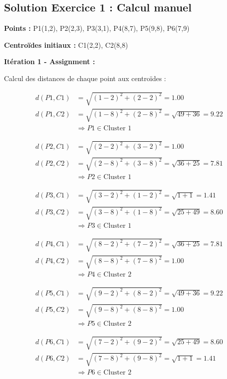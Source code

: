\documentclass[11pt,a4paper]{article}
\begin{document}
\subsection{Solution Exercice 1 : Calcul manuel}

\begin{solutionbox}
\textbf{Points :} P1(1,2), P2(2,3), P3(3,1), P4(8,7), P5(9,8), P6(7,9)

\textbf{Centroïdes initiaux :} C1(2,2), C2(8,8)

\textbf{Itération 1 - Assignment :}

Calcul des distances de chaque point aux centroïdes :

\begin{align*}
d(P1, C1) &= \sqrt{(1-2)^2 + (2-2)^2} = 1.00 \\
d(P1, C2) &= \sqrt{(1-8)^2 + (2-8)^2} = \sqrt{49 + 36} = 9.22 \\
&\Rightarrow P1 \in \text{Cluster 1}
\end{align*}

\begin{align*}
d(P2, C1) &= \sqrt{(2-2)^2 + (3-2)^2} = 1.00 \\
d(P2, C2) &= \sqrt{(2-8)^2 + (3-8)^2} = \sqrt{36 + 25} = 7.81 \\
&\Rightarrow P2 \in \text{Cluster 1}
\end{align*}

\begin{align*}
d(P3, C1) &= \sqrt{(3-2)^2 + (1-2)^2} = \sqrt{1 + 1} = 1.41 \\
d(P3, C2) &= \sqrt{(3-8)^2 + (1-8)^2} = \sqrt{25 + 49} = 8.60 \\
&\Rightarrow P3 \in \text{Cluster 1}
\end{align*}

\begin{align*}
d(P4, C1) &= \sqrt{(8-2)^2 + (7-2)^2} = \sqrt{36 + 25} = 7.81 \\
d(P4, C2) &= \sqrt{(8-8)^2 + (7-8)^2} = 1.00 \\
&\Rightarrow P4 \in \text{Cluster 2}
\end{align*}

\begin{align*}
d(P5, C1) &= \sqrt{(9-2)^2 + (8-2)^2} = \sqrt{49 + 36} = 9.22 \\
d(P5, C2) &= \sqrt{(9-8)^2 + (8-8)^2} = 1.00 \\
&\Rightarrow P5 \in \text{Cluster 2}
\end{align*}

\begin{align*}
d(P6, C1) &= \sqrt{(7-2)^2 + (9-2)^2} = \sqrt{25 + 49} = 8.60 \\
d(P6, C2) &= \sqrt{(7-8)^2 + (9-8)^2} = \sqrt{1 + 1} = 1.41 \\
&\Rightarrow P6 \in \text{Cluster 2}
\end{align*}


\end{solutionbox}
\end{document}
